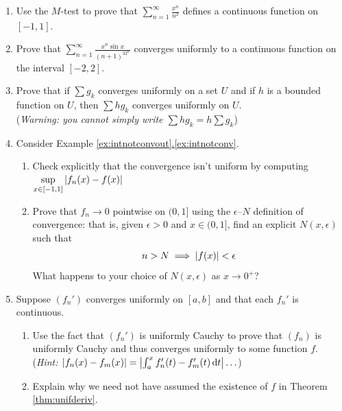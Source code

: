 \begin{exercises}
\begin{enumerate}
	

	
	\item Use the $M$-test to prove that $\displaystyle\sum\limits_{n=1}^\infty\frac{x^n}{n^2}$ defines a continuous function on $[-1,1]$.
  
  \item Prove that $\displaystyle\sum\limits_{n=1}^\infty\frac{x^n\sin x}{(n+1)^32^n}$ converges uniformly to a continuous function on the interval $[-2,2]$.

 \item Prove that if $\sum g_k$ converges uniformly on a set $U$ and if $h$ is a bounded function on $U$, then $\sum hg_k$ converges uniformly on $U$.\\
 (\emph{Warning: you cannot simply write $\sum hg_k=h\sum g_k$})


	\item Consider Example \hyperref[ex:intnotconv]{\ref*{ex:intnotconvout}.\ref*{ex:intnotconv}}.
	\begin{enumerate}
	  \item Check explicitly that the convergence isn't uniform by computing $\sup\limits_{x\in[-1,1]}\left| f_n(x)-f(x)\right|$
	  \item Prove that $f_n\to 0$ pointwise on $(0,1]$ using the $\epsilon$--$N$ definition of convergence: that is, given $\epsilon>0$ and $x\in(0,1]$, find an explicit $N(x,\epsilon)$ such that
  	\[n>N\implies \left| f(x)\right|<\epsilon\]
  	What happens to your choice of $N(x,\epsilon)$ as $x\to 0^+$?
	\end{enumerate}
	
	\item\label{ex:derivunifconvtidy} Suppose $(f_n')$ converges uniformly on $[a,b]$ and that each $f_n'$ is continuous.
	\begin{enumerate}
	  \item Use the fact that $(f_n')$ is uniformly Cauchy to prove that $(f_n)$ is uniformly Cauchy and thus converges uniformly to some function $f$.\\
		(\emph{Hint: $\left| f_n(x)-f_m(x)\right|=\left| \int_a^xf_n'(t)-f_m'(t)\,{\mathrm{d} t}\right|\ldots$})
		\item Explain why we need not have assumed the existence of $f$ in Theorem \ref{thm:unifderiv}.
	\end{enumerate}
\end{enumerate}
\end{exercises}


